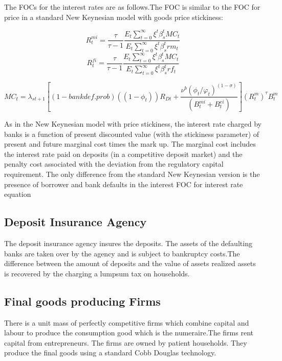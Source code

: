 \documentclass[12pt]{article}
\numberwithin{equation}{section}
\begin{document}
\begin{appendix}
The FOCs for the interest rates are as follows.The FOC is similar to the FOC for price in a standard New Keynesian model with goods price stickiness:

\begin{equation}
R^{mi}_t=\frac{\tau}{\tau-1}\frac{E_t\sum _{t=0}^{\infty }\xi^t\beta_{s}^t MC_t}{E_t\sum _{t=0}^{\infty }\xi^t\beta_{s}^t rm_t}
\end{equation}
\begin{equation}
R^{fi}_t=\frac{\tau}{\tau-1}\frac{E_t\sum _{t=0}^{\infty }\xi^t\beta_{s}^t MC_t}{E_t\sum _{t=0}^{\infty }\xi^t\beta_{s}^t rf_t}
\end{equation}

\begin{equation}
MC_t=\lambda_{st+1}[(1-bankdef.prob)((1-\phi_t))R_{Dt}+\frac{\nu^b(\phi_t/\varphi_t)^{(1-\sigma)}}{(B^{mi}_t+B^{ei}_t)}](R^m_t)^\tau B^m_t
\end{equation}

As in the New Keynesian model with price stickiness, the interest rate charged by banks is a function of present discounted value (with the stickiness parameter) of present and future marginal cost times the mark up. The marginal cost includes the interest rate paid on deposits (in a competitive deposit market) and the penalty cost associated with the deviation from the regulatory capital requirement. The only difference from the standard New Keynesian version is the presence of borrower and bank defaults in the interest FOC for interest rate equation

\subsection*{Deposit Insurance Agency}

The deposit insurance agency insures the deposits. The assets of the defaulting banks are taken over by the agency and is subject to bankruptcy costs.The difference between the amount of deposits and the value of assets realized assets is recovered by the charging a lumpsum tax on households. 


\subsection*{Final goods producing Firms} 

There is a unit mass of perfectly competitive firms which combine capital and labour to produce the consumption good which is the numeraire.The firms rent capital from entrepreneurs. The firms are owned by patient households. They produce the final goods using a standard Cobb Douglas technology.


\end{appendix}
\end{document}
